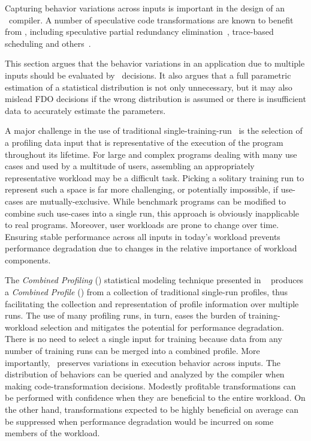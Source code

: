 

Capturing behavior variations across inputs is important in the design
of an \FDO\ compiler. A number of speculative code transformations are
known to benefit from \FDO, including speculative partial redundancy
elimination~\cite{ChowChanPLDI97,GuptaICCL98}, trace-based
scheduling and others~\cite{BodikGuptaPLDI97,ChekuriMICRO96}.

This section argues that the behavior
variations in an application due to multiple inputs should be
evaluated by \FDO\ decisions.  It also argues that a full parametric
estimation of a statistical distribution is not only unnecessary, but
it may also mislead FDO decisions if the wrong distribution is assumed
or there is insufficient data to accurately estimate the
parameters.

A major challenge in the use of traditional single-training-run \FDO\
is the selection of a profiling data input that is representative of
the execution of the program throughout its lifetime.  For large and
complex programs dealing with many use cases and used by a multitude
of users, assembling an appropriately representative workload may be a
difficult task.  Picking a solitary training run to represent such a
space is far more challenging, or potentially impossible, if use-cases
are mutually-exclusive.  While benchmark programs can be modified to
combine such use-cases into a single run,
this approach is obviously inapplicable to real programs.  Moreover,
user workloads are prone to change over time.  Ensuring stable
performance across all inputs in today's workload prevents performance
degradation due to changes in the relative importance of workload
components.

The {\em Combined Profiling} (\CP) statistical modeling technique
presented in ~\cite{BerubePhD} produces a {\it Combined Profile} (\CProf)
from a collection of traditional single-run profiles, thus
facilitating the collection and representation of profile information
over multiple runs. The use of many profiling runs, in turn, eases the
burden of training-workload selection and mitigates the potential for
performance degradation.  There is no need to select a single input
for training because data from any number of training runs can be
merged into a combined profile.  More importantly, \CP\ preserves
variations in execution behavior across inputs.  The distribution of
behaviors can be queried and analyzed by the compiler when making
code-transformation decisions.  Modestly profitable transformations
can be performed with confidence when they are beneficial to the
entire workload. On the other hand, transformations expected to be
highly beneficial on average can be suppressed when performance
degradation would be incurred on some members of the workload.

